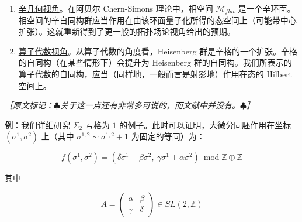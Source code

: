 \begin{enumerate}
  \begin{equation}
    \Gamma_g/N_g
    \tag{2.227}
    \label{eq:2.227}
  \end{equation}

  辛地作用在格 $H_1(\Sigma_2;\mathbb{Z})$ 上；事实上，利用 Dehn 扭转以及 $Sp(2g;\mathbb{Z})$ 的一组生成元，可以验证

  \begin{equation}
    \Gamma_g/N_g\cong Sp(2g;\mathbb{Z})
    \tag{2.228}
    \label{eq:2.228}
  \end{equation}

  {\small\itshape ［原文标记：$\clubsuit$生成元请参见附录。$\clubsuit$］}

  当 $g=1$ 时不存在分离曲线，故 $N_g=1$，此时 $\Gamma_1\cong Sp(2;\mathbb{Z})=SL(2,\mathbb{Z})$。在阿贝尔情形，平坦联络的模空间是由 $H_1(\Sigma_2;\mathbb{Z})$ 构造出的辛环面，因此我们预期波函数按这个群的射影表示变换。

  \item \underline{辛几何视角}。在阿贝尔 Chern-Simons 理论中，相空间 $\mathcal{M}_{flat}$ 是一个辛环面。相空间的辛自同构群应当作用在由该环面量子化所得的态空间上（可能带中心扩张）。这就重新得到了更一般的拓扑场论视角给出的预期。

  \item \underline{算子代数视角}。从算子代数的角度看，Heisenberg 群是辛格的一个扩张。辛格的自同构（在某些情形下）会提升为 Heisenberg 群的自同构。我们所表示的算子代数的自同构，应当（同样地，一般而言是射影地）作用在态的 Hilbert 空间上。
\end{enumerate}

{\small\itshape ［原文标记：$\clubsuit$关于这一点还有非常多可说的，而文献中并没有。$\clubsuit$］}

\medskip
\noindent\textbf{例}：我们详细研究 $\Sigma_2$ 亏格为 $1$ 的例子。此时可以证明，大微分同胚作用在坐标 $(\sigma^1,\sigma^2)$ 上（其中 $\sigma^{1,2}\sim\sigma^{1,2}+1$ 为固定的等同）为：

\begin{equation}
  f(\sigma^1,\sigma^2)=(\delta\sigma^1+\beta\sigma^2,\ \gamma\sigma^1+\alpha\sigma^2)\ \operatorname{mod}\mathbb{Z}\oplus\mathbb{Z}
  \tag{2.229}
  \label{eq:2.229}
\end{equation}

其中

\begin{equation}
  A=\begin{pmatrix}\alpha & \beta\\ \gamma & \delta\end{pmatrix}\in SL(2,\mathbb{Z})
  \tag{2.230}
  \label{eq:2.230}
\end{equation}


